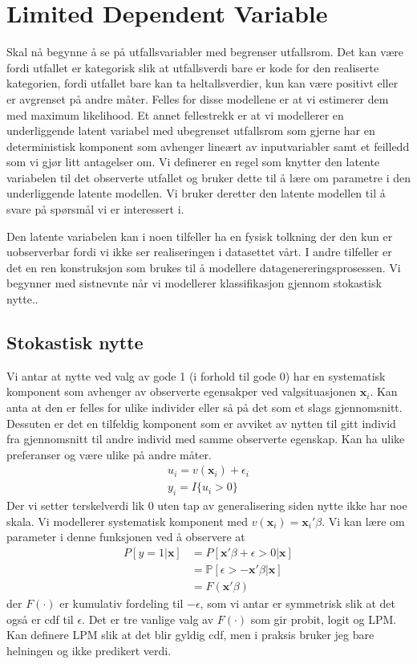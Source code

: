 \section{Limited Dependent Variable}
Skal nå begynne å se på utfallsvariabler med begrenser utfallsrom. Det kan være fordi utfallet er kategorisk slik at utfallsverdi bare er kode for den realiserte kategorien, fordi utfallet bare kan ta heltallsverdier, kun kan være positivt eller er avgrenset på andre måter. Felles for disse modellene er at vi estimerer dem med maximum likelihood. Et annet fellestrekk er at vi modellerer en underliggende latent variabel med ubegrenset utfallsrom som gjerne har en deterministisk komponent som avhenger lineært av inputvariabler samt et feilledd som vi gjør litt antagelser om. Vi definerer en regel som knytter den latente variabelen til det observerte utfallet og bruker dette til å lære om parametre i den underliggende latente modellen. Vi bruker deretter den latente modellen til å svare på spørsmål vi er interessert i.

Den latente variabelen kan i noen tilfeller ha en fysisk tolkning der den kun er uobserverbar fordi vi ikke ser realiseringen i datasettet vårt. I andre tilfeller er det en ren konstruksjon som brukes til å modellere datagenereringsprosessen. Vi begynner med sistnevnte når vi modellerer klassifikasjon gjennom stokastisk nytte..
\subsection{Stokastisk nytte}
Vi antar at nytte ved valg av gode 1 (i forhold til gode 0) har en systematisk komponent som avhenger av observerte egensakper ved valgsituasjonen $\mathbf{x}_i$. Kan anta at den er felles for ulike individer eller så på det som et slags gjennomsnitt. Dessuten er det en tilfeldig komponent som er avviket av nytten til gitt individ fra gjennomsnitt til andre individ med samme observerte egenskap. Kan ha ulike preferanser og være ulike på andre måter.
\begin{align}
u_i = v(\mathbf{x}_i) + \epsilon_i \\
y_i = I\{u_i>0\} 
\end{align}
Der vi setter terskelverdi lik 0 uten tap av generalisering siden nytte ikke har noe skala. Vi modellerer systematisk komponent med $v(\mathbf{x}_i) = \mathbf{x}_i'\beta$. Vi kan lære om parameter i denne funksjonen ved å observere at 
\begin{align}
P[y=1|\mathbf{x}] &= P[\mathbf{x}'\beta + \epsilon > 0|\mathbf{x}] \\
&= \mathbb{P}[\epsilon > -\mathbf{x}'\beta|\mathbf{x}] \\
&= F(\mathbf{x}'\beta)
\end{align}
der $F(\cdot)$ er kumulativ fordeling til $-\epsilon$, som vi antar er symmetrisk slik at det også er cdf til $\epsilon$. Det er tre vanlige valg av $F(\cdot)$ som gir probit, logit og LPM. Kan definere LPM slik at det blir gyldig cdf, men i praksis bruker jeg bare helningen og ikke predikert verdi.
